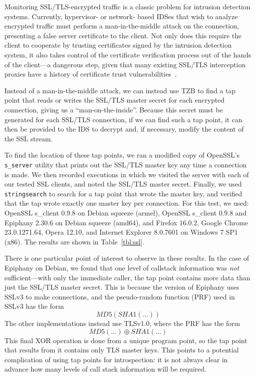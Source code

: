 Monitoring SSL/TLS-encrypted traffic is a classic problem for intrusion
detection systems. Currently, hypervisor- or network- based IDSes that
wish to analyze encrypted traffic must perform a man-in-the-middle
attack on the connection, presenting a false server certificate to the
client. Not only does this require the client to cooperate by trusting
certificates signed by the intrusion detection system, it also takes
control of the certificate verification process out of the hands of the
client---a dangerous step, given that many existing SSL/TLS interception
proxies have a history of certificate trust
vulnerabilities~\cite{JarmocBHEU2012}.

Instead of a man-in-the-middle attack, we can instead use TZB to find a
tap point that reads or writes the SSL/TLS master secret for each
encrypted connection, giving us a ``man-on-the-inside''. Because this
secret must be generated for each SSL/TLS connection, if we can find
such a tap point, it can then be provided to the IDS to decrypt and, if
necessary, modify the content of the SSL stream.

To find the location of these tap points, we ran a modified copy of
OpenSSL's \texttt{s\_server} utility that prints out the SSL/TLS master
key any time a connection is made. We then recorded executions in which
we visited the server with each of our tested SSL clients, and noted the
SSL/TLS master secret. Finally, we used \texttt{stringsearch} to search
for a tap point that wrote the master key, and verified that the tap
wrote exactly one master key per connection. For this test, we used:
OpenSSL s\_client 0.9.8 on Debian squeeze (armel), OpenSSL s\_client
0.9.8 and Epiphany 2.30.6 on Debian squeeze (amd64), and Firefox
16.0.2, Google Chrome 23.0.1271.64, Opera 12.10, and Internet Explorer
8.0.7601 on Windows 7 SP1 (x86). The results are shown in
Table~\ref{tbl:ssl}.

There is one particular point of interest to observe in these results.
In the case of Epiphany on Debian, we found that one level of callstack
information was \emph{not} sufficient---with only the immediate caller,
the tap point contains more data than just the SSL/TLS master secret.
This is because the version of Epiphany uses SSLv3 to make connections,
and the pseudo-random function (PRF) used in SSLv3 has the form
\[ MD5(SHA1(\ldots))\] The other implementations instead use TLSv1.0, where
the PRF has the form \[ MD5(\ldots) \oplus SHA1(\ldots) \] This final
XOR operation is done from a unique program point, so the tap point that
results from it contains only TLS master keys. This points to a
potential complication of using tap points for introspection: it is not
always clear in advance how many levels of call stack information will
be required.

